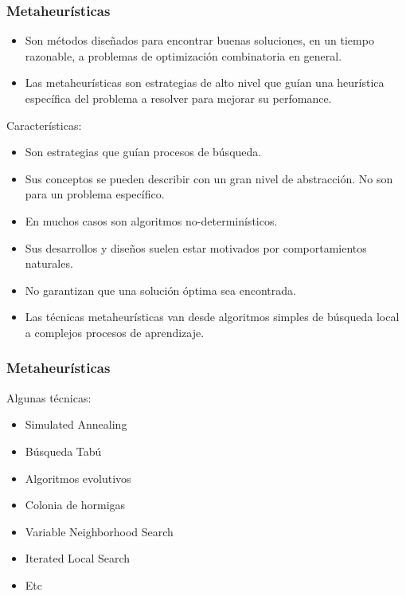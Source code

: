 \documentclass{beamer}
\begin{document}
\begin{frame}
\frametitle{Metaheurísticas}

\begin{itemize}
    \item Son métodos diseñados para encontrar buenas soluciones, en un tiempo razonable, a problemas de optimización combinatoria en general.
    \pause
    \item Las metaheurísticas son estrategias de alto nivel que guían una heurística específica del problema a resolver para mejorar su perfomance.
    \pause
\end{itemize}

Caracter\'isticas:

\begin{itemize}
    \item Son estrategias que gu\'ian procesos de búsqueda.
    \pause
    \item Sus conceptos se pueden describir con un gran nivel de abstracción. No son para un problema específico.
    \pause
    \item En muchos casos son algoritmos no-determin\'isticos.
    \pause
    \item Sus desarrollos y diseños suelen estar motivados por comportamientos naturales.
    \pause
    \item No garantizan que una soluci\'on \'optima sea encontrada.
    \pause
    \item Las t\'ecnicas metaheur\'isticas van desde algoritmos simples de b\'usqueda local a complejos procesos de aprendizaje.
\end{itemize}

\end{frame}


\begin{frame}
\frametitle{Metaheurísticas}

Algunas técnicas:

\begin{itemize}
    \item Simulated Annealing
    \pause
    \item Búsqueda Tabú
    \pause
    \item Algoritmos evolutivos
    \pause
    \item Colonia de hormigas
    \pause
    \item Variable Neighborhood Search
    \pause
    \item Iterated Local Search
    \pause
    \item Etc
\end{itemize}

\end{frame}
\end{document}
